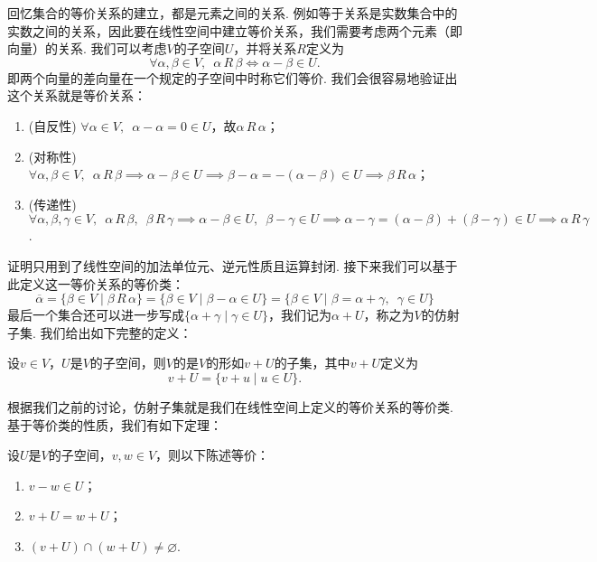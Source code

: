 回忆集合的等价关系的建立，都是元素之间的关系. 例如等于关系是实数集合中的实数之间的关系，因此要在线性空间中建立等价关系，我们需要考虑两个元素（即向量）的关系. 我们可以考虑$V$的子空间$U$，并将关系$R$定义为
\[\forall\alpha,\beta\in V,\enspace\alpha\,R\,\beta\iff \alpha-\beta\in U.\]
即两个向量的差向量在一个规定的子空间中时称它们等价. 我们会很容易地验证出这个关系就是等价关系：
\begin{enumerate}
    \item (自反性) $\forall \alpha\in V,\enspace\alpha-\alpha=0\in U$，故$\alpha\,R\,\alpha$；

    \item (对称性) $\forall \alpha,\beta\in V,\enspace\alpha\,R\,\beta\implies \alpha-\beta\in U\implies \beta-\alpha=-(\alpha-\beta)\in U\implies \beta\,R\,\alpha$；

    \item (传递性) $\forall \alpha,\beta,\gamma\in V,\enspace\alpha\,R\,\beta,\enspace\beta\,R\,\gamma\implies \alpha-\beta\in U,\enspace\beta-\gamma\in U\implies \alpha-\gamma=(\alpha-\beta)+(\beta-\gamma)\in U\implies \alpha\,R\,\gamma$.
\end{enumerate}
证明只用到了线性空间的加法单位元、逆元性质且运算封闭. 接下来我们可以基于此定义这一等价关系的等价类：
\[\overline{\alpha}=\{\beta\in V \mid \beta\,R\,\alpha\}=\{\beta\in V \mid \beta-\alpha\in U\}=\{\beta\in V \mid \beta=\alpha+\gamma,\enspace\gamma\in U\}\]
最后一个集合还可以进一步写成$\{\alpha+\gamma \mid \gamma\in U\}$，我们记为$\alpha+U$，称之为$V$的仿射子集. 我们给出如下完整的定义：
\begin{definition}[仿射子集] 
    设$v\in V$，$U$是$V$的子空间，则$V$的是$V$的形如$v+U$的子集，其中$v+U$定义为
    \[v+U=\{v+u \mid u\in U\}.\]
\end{definition}
根据我们之前的讨论，仿射子集就是我们在线性空间上定义的等价关系的等价类. 基于等价类的性质，我们有如下定理：
\begin{theorem}
    设$U$是$V$的子空间，$v,w\in V$，则以下陈述等价：
    \begin{enumerate}
        \item $v-w\in U$；

        \item $v+U=w+U$；

        \item $(v+U)\cap(w+U)\neq \varnothing$.
    \end{enumerate}
\end{theorem}


